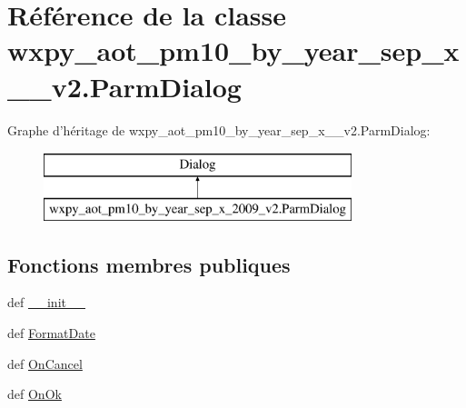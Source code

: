 \hypertarget{classwxpy__aot__pm10__by__year__sep__x__2009__v2_1_1_parm_dialog}{\section{Référence de la classe wxpy\-\_\-aot\-\_\-pm10\-\_\-by\-\_\-year\-\_\-sep\-\_\-x\-\_\-\_\-v2.\-Parm\-Dialog}
\label{classwxpy__aot__pm10__by__year__sep__x__2009__v2_1_1_parm_dialog}
}
Graphe d'héritage de wxpy\-\_\-aot\-\_\-pm10\-\_\-by\-\_\-year\-\_\-sep\-\_\-x\-\_\-\_\-v2.\-Parm\-Dialog\-:\begin{figure}[H]
\begin{center}
\leavevmode
\includegraphics[height=2.000000cm]{classwxpy__aot__pm10__by__year__sep__x__2009__v2_1_1_parm_dialog}
\end{center}
\end{figure}
\subsection*{Fonctions membres publiques}
\begin{DoxyCompactItemize}
\item 
def \hyperlink{classwxpy__aot__pm10__by__year__sep__x__2009__v2_1_1_parm_dialog_a9c5514da89e4946fa0841ec6690efe8c}{\-\_\-\-\_\-init\-\_\-\-\_\-}
\item 
def \hyperlink{classwxpy__aot__pm10__by__year__sep__x__2009__v2_1_1_parm_dialog_ae016f1348d6cde5a842f3a7023ab1f4b}{Format\-Date}
\item 
def \hyperlink{classwxpy__aot__pm10__by__year__sep__x__2009__v2_1_1_parm_dialog_aac3dd041f841200317d2e42bb9cba7da}{On\-Cancel}
\item 
def \hyperlink{classwxpy__aot__pm10__by__year__sep__x__2009__v2_1_1_parm_dialog_a4eab08f0ce234ae207e2dc92c05cac8a}{On\-Ok}
\end{DoxyCompactItemize}
